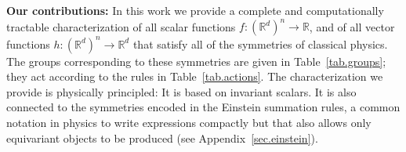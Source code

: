 \documentclass{article}
\renewcommand{\paragraph}[1]{\par\textbf{#1}}
\theoremstyle{Hogg}
\begin{document}
\paragraph{Our contributions:} \label{sec.contributions}
In this work we provide a complete and computationally tractable characterization of all scalar functions $f:(\mathbb R^d)^n \to \mathbb R$, and of all vector functions $h:(\mathbb R^d)^n \to \mathbb R^d$ that satisfy all of the symmetries of classical physics.
The groups corresponding to these symmetries are given in Table~\ref{tab.groups};
they act according to the rules in Table~\ref{tab.actions}.
The characterization we provide is physically principled: It is based on invariant scalars. It is also connected to the symmetries encoded in the Einstein summation rules, a common notation in physics to write expressions compactly but that also allows only equivariant objects to be produced (see Appendix~\ref{sec.einstein}).
\end{document}
